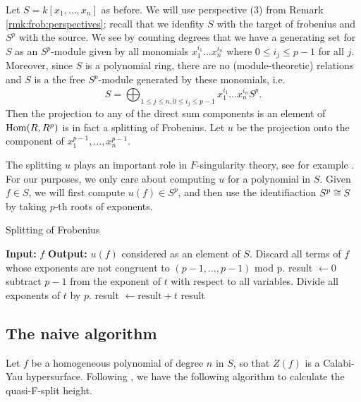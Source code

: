 Let \(S = k[x_{1}, \ldots, x_{n}]\) as before. 
We will use perspective (3) from
Remark \ref{rmk:frob:perspectives}; 
recall that we idenfity 
\(S\) with the target of frobenius and
\(S^{p}\) with the source.
We see 
by counting degrees
that we have a generating set for \(S\) as an
\(S^{p}\)-module given by
all monomials
\(x_{1}^{i_{1}}\ldots x_{n}^{i_{n}}\)
where \(0 \leq i_{j} \leq p-1\) for all \(j\).
Moreover, since \(S\) is a polynomial ring, 
there are no (module-theoretic) relations
and
\(S\) is a the free \(S^{p}\)-module generated by 
these monomials, i.e.  \[
S = \bigoplus_{1 \leq j \leq n, 0 \leq i_{j} \leq p-1}^{} x_{1}^{i_{1}}\ldots x_{n}^{i_{n}} S^{p}
.\] 
Then the projection to any of the direct sum components
is an element of \(\operatorname{Hom}(R,R^{p})\) is in fact a
splitting of Frobenius.
Let \(u\) be the projection onto the component of
\(x_{1}^{p-1}, \ldots, x_{n}^{p-1}\).

The splitting \(u\) plays an important role in \(F\)-singularity
theory, see for example 
\cite[Claim~2.6]{ma-polstra-2021-F-sing-comm-alg}.
For our purposes, we only care about computing \(u\) 
for a polynomial in \(S\). 
Given \(f \in S\), we will first compute
\(u(f) \in S^{p}\), and then use the identifiaction
\(S^{p} \cong S\) by taking \(p\)-th roots of 
exponents.

\begin{algorithm}
\caption{Splitting of Frobenius}
\label{alg:naive:u}
\begin{algorithmic}[1]
\State \textbf{Input:} \(f\) 
\State \textbf{Output:} \(u(f)\) considered as an element of \(S\).
\State Discard all terms of \(f\) whose exponents are not congruent to
	\((p-1, \ldots, p-1)\) mod p.
\State result \(\gets 0\)	
    \State subtract \(p-1\) from the exponent of 
	    \(t\) with respect to all variables.
    \State Divide all exponents of \(t\) by \(p\).
    \State result \(\gets \text{result} + t\)
\EndFor 
\State \Return result
\end{algorithmic}
\end{algorithm}


\subsection{The naive algorithm}

Let \(f\) be a homogeneous polynomial of degree \(n\) 
in \(S\), 
so that \(Z(f)\) is a Calabi-Yau hypersurface.
Following \cite{kty-2022-fedder}, we have the following
algorithm to calculate the quasi-F-split height.

